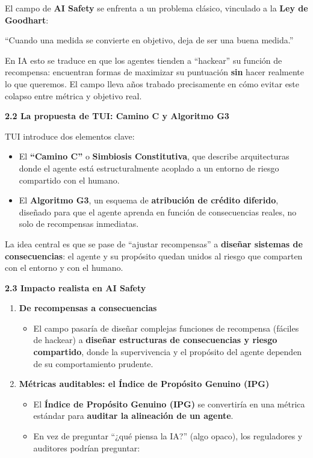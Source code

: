 El campo de \textbf{AI Safety} se enfrenta a un problema clásico,
vinculado a la \textbf{Ley de Goodhart}:

``Cuando una medida se convierte en objetivo, deja de ser una buena
medida.''

En IA esto se traduce en que los agentes tienden a ``hackear'' su
función de recompensa: encuentran formas de maximizar su puntuación
\textbf{sin} hacer realmente lo que queremos. El campo lleva años
trabado precisamente en cómo evitar este colapso entre métrica y
objetivo real.

\textbf{2.2 La propuesta de TUI: Camino C y Algoritmo G3}

TUI introduce dos elementos clave:

\begin{itemize}
\item
  El \textbf{``Camino C''} o \textbf{Simbiosis Constitutiva}, que
  describe arquitecturas donde el agente está estructuralmente acoplado
  a un entorno de riesgo compartido con el humano.
\item
  El \textbf{Algoritmo G3}, un esquema de \textbf{atribución de crédito
  diferido}, diseñado para que el agente aprenda en función de
  consecuencias reales, no solo de recompensas inmediatas.
\end{itemize}

La idea central es que se pase de ``ajustar recompensas'' a
\textbf{diseñar sistemas de consecuencias}: el agente y su propósito
quedan unidos al riesgo que comparten con el entorno y con el humano.

\textbf{2.3 Impacto realista en AI Safety}

\begin{enumerate}
\def\labelenumi{\arabic{enumi}.}
\item
  \textbf{De recompensas a consecuencias}

  \begin{itemize}
  \item
    El campo pasaría de diseñar complejas funciones de recompensa
    (fáciles de hackear) a \textbf{diseñar estructuras de consecuencias
    y riesgo compartido}, donde la supervivencia y el propósito del
    agente dependen de su comportamiento prudente.
  \end{itemize}
\item
  \textbf{Métricas auditables: el Índice de Propósito Genuino (IPG)}

  \begin{itemize}
  \item
    El \textbf{Índice de Propósito Genuino (IPG)} se convertiría en una
    métrica estándar para \textbf{auditar la alineación de un agente}.
  \item
    En vez de preguntar ``¿qué piensa la IA?'' (algo opaco), los
    reguladores y auditores podrían preguntar:
  \end{itemize}
\end{enumerate}


